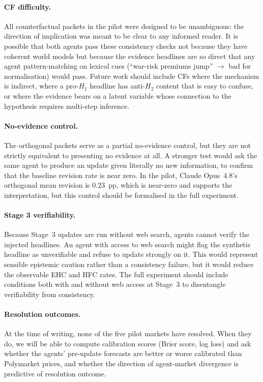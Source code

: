 \paragraph{CF difficulty.}
All counterfactual packets in the pilot were designed to be unambiguous: the direction of
implication was meant to be clear to any informed reader.  It is possible that both agents pass
these consistency checks not because they have coherent world models but because the evidence
headlines are so direct that any agent pattern-matching on lexical cues (``war-risk premiums
jump'' $\to$ bad for normalisation) would pass.  Future work should include CFs where the
mechanism is indirect, where a pro-$H_1$ headline has anti-$H_2$ content that is easy to
confuse, or where the evidence bears on a latent variable whose connection to the hypothesis
requires multi-step inference.

\paragraph{No-evidence control.}
The orthogonal packets serve as a partial no-evidence control, but they are not strictly
equivalent to presenting no evidence at all.  A stronger test would ask the same agent to
produce an update given literally no new information, to confirm that the baseline revision
rate is near zero.  In the pilot, Claude Opus~4.8's orthogonal mean revision is $0.23$~pp,
which is near-zero and supports the interpretation, but this control should be formalised in
the full experiment.

\paragraph{Stage 3 verifiability.}
Because Stage~3 updates are run without web search, agents cannot verify the injected
headlines.  An agent with access to web search might flag the synthetic headline as
unverifiable and refuse to update strongly on it.  This would represent sensible epistemic
caution rather than a consistency failure, but it would reduce the observable EHC and HFC
rates.  The full experiment should include conditions both with and without web access at
Stage~3 to disentangle verifiability from consistency.

\paragraph{Resolution outcomes.}
At the time of writing, none of the five pilot markets have resolved.  When they do, we will
be able to compute calibration scores (Brier score, log loss) and ask whether the agents'
pre-update forecasts are better or worse calibrated than Polymarket prices, and whether
the direction of agent-market divergence is predictive of resolution outcome.

